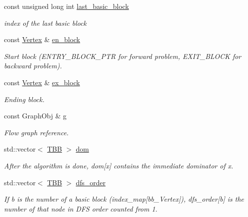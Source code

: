 \begin{DoxyCompactItemize}
const unsigned long int \hyperlink{classdom__info_a1361f1a9f7e6317234ca035f253eca11}{last\+\_\+basic\+\_\+block}
\begin{DoxyCompactList}\small\item\em index of the last basic block \end{DoxyCompactList}\item 
const \hyperlink{classdom__info_a5e4ca21e2c5281bdbb95d2c8d965c9be}{Vertex} \& \hyperlink{classdom__info_a7f31774036bc8d3385e5f85c087d798f}{en\+\_\+block}
\begin{DoxyCompactList}\small\item\em Start block (E\+N\+T\+R\+Y\+\_\+\+B\+L\+O\+C\+K\+\_\+\+P\+TR for forward problem, E\+X\+I\+T\+\_\+\+B\+L\+O\+CK for backward problem). \end{DoxyCompactList}\item 
const \hyperlink{classdom__info_a5e4ca21e2c5281bdbb95d2c8d965c9be}{Vertex} \& \hyperlink{classdom__info_aa625c50f21a56328df0b820f201a4b51}{ex\+\_\+block}
\begin{DoxyCompactList}\small\item\em Ending block. \end{DoxyCompactList}\item 
const Graph\+Obj \& \hyperlink{classdom__info_a6cd48ccbc3af5826247fcea773b4d65b}{g}
\begin{DoxyCompactList}\small\item\em Flow graph reference. \end{DoxyCompactList}\item 
std\+::vector$<$ \hyperlink{Dominance_8hpp_ac35ffd4ddeccae8225d6ec6f55d65a97}{T\+BB} $>$ \hyperlink{classdom__info_a60f3c6b06eac40aa2462bfa7c473772a}{dom}
\begin{DoxyCompactList}\small\item\em After the algorithm is done, dom\mbox{[}x\mbox{]} contains the immediate dominator of x. \end{DoxyCompactList}\item 
std\+::vector$<$ \hyperlink{Dominance_8hpp_ac35ffd4ddeccae8225d6ec6f55d65a97}{T\+BB} $>$ \hyperlink{classdom__info_a50d93a521711056391d2faef621c3e86}{dfs\+\_\+order}
\begin{DoxyCompactList}\small\item\em If b is the number of a basic block (index\+\_\+map\mbox{[}bb\+\_\+\+Vertex\mbox{]}), dfs\+\_\+order\mbox{[}b\mbox{]} is the number of that node in D\+FS order counted from 1. \end{DoxyCompactList}\item 

\end{DoxyCompactItemize}

